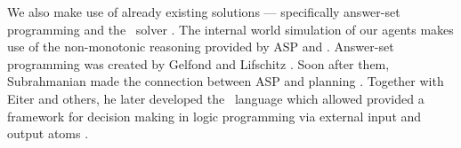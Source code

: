 We also make use of already existing solutions --- specifically answer-set programming and the \acthex\ solver \dlvhex. The internal world simulation of our agents makes use of the non-monotonic reasoning provided by ASP and \acthex.  Answer-set programming was created by Gelfond and Lifschitz \cite{asp1}. Soon after them, Subrahmanian made the connection between ASP and planning \cite{Subrahmanian95relatingstable}. Together with Eiter and others, he later developed the \acthex\ language which allowed provided a framework for decision making in logic programming via external input and output atoms \cite{heterogeneous1, heterogeneous2, heterogeneous3}.